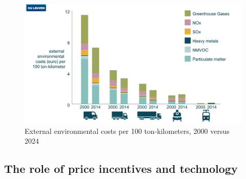 \documentclass[../summary.tex]{subfiles}
\begin{document}
	\begin{figure}[H]
		\centering
		\includegraphics[width=1\linewidth]{images/9-external-environmental-cost.png}
		\caption{External environmental costs per 100 ton-kilometers, 2000 versus 2024}
		\label{fig:external-environmental-costs}
	\end{figure}
	\newpage
	
	\subsection{The role of price incentives and technology}
	
\end{document}
